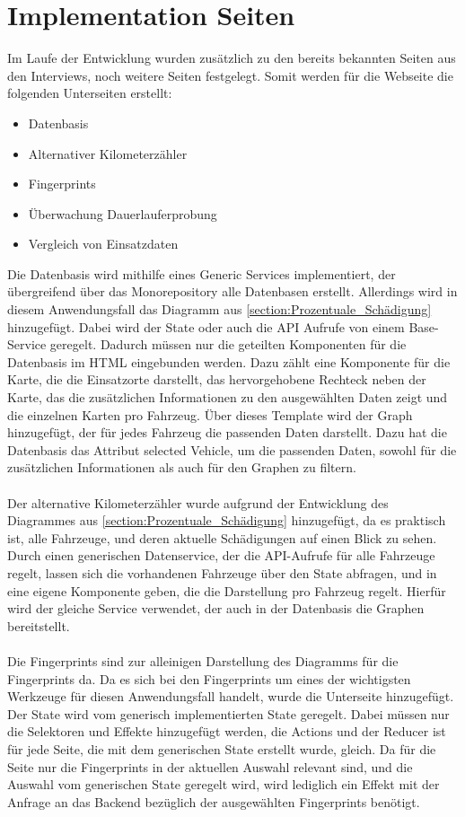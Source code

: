 \section{Implementation Seiten}
Im Laufe der Entwicklung wurden zusätzlich zu den bereits bekannten Seiten aus den Interviews, noch weitere Seiten festgelegt. Somit werden für die Webseite die folgenden Unterseiten erstellt:
\begin{itemize}
    \item Datenbasis
    \item Alternativer Kilometerzähler
    \item Fingerprints
    \item Überwachung Dauerlauferprobung
    \item Vergleich von Einsatzdaten
\end{itemize}
Die Datenbasis wird mithilfe eines Generic Services implementiert, der übergreifend über das Monorepository alle Datenbasen erstellt. Allerdings wird in diesem Anwendungsfall das Diagramm aus \ref{section:Prozentuale_Schädigung} hinzugefügt. Dabei wird der State oder auch die API Aufrufe von einem Base-Service geregelt. Dadurch müssen nur die geteilten Komponenten für die Datenbasis im HTML eingebunden werden. Dazu  zählt eine Komponente für die Karte, die die Einsatzorte darstellt, das hervorgehobene Rechteck neben der Karte, das die zusätzlichen Informationen zu den ausgewählten Daten zeigt und die einzelnen Karten pro Fahrzeug. Über dieses Template wird der Graph hinzugefügt, der für jedes Fahrzeug die passenden Daten darstellt. Dazu hat die Datenbasis das Attribut selected Vehicle, um die passenden Daten, sowohl für die zusätzlichen Informationen als auch für den Graphen zu filtern.\\\\ Der alternative Kilometerzähler wurde aufgrund der Entwicklung des Diagrammes aus \ref{section:Prozentuale_Schädigung} hinzugefügt, da es praktisch ist, alle Fahrzeuge, und deren aktuelle Schädigungen auf einen Blick zu sehen. Durch einen generischen Datenservice, der die API-Aufrufe für alle Fahrzeuge regelt, lassen sich die vorhandenen Fahrzeuge über den State abfragen, und in eine eigene Komponente geben, die die Darstellung pro Fahrzeug regelt. Hierfür wird der gleiche Service verwendet, der auch in der Datenbasis die Graphen bereitstellt.\\\\ Die Fingerprints sind zur alleinigen Darstellung des Diagramms für die Fingerprints da. Da es sich bei den Fingerprints um eines der wichtigsten Werkzeuge für diesen Anwendungsfall handelt, wurde die Unterseite hinzugefügt. Der State wird vom generisch implementierten State geregelt. Dabei müssen nur die Selektoren und Effekte hinzugefügt werden, die Actions und der Reducer ist für jede Seite, die mit dem generischen State erstellt wurde, gleich. Da für die Seite nur die Fingerprints in der aktuellen Auswahl relevant sind, und die Auswahl vom generischen State geregelt wird, wird lediglich ein Effekt mit der Anfrage an das Backend bezüglich der ausgewählten Fingerprints benötigt.\\\\
